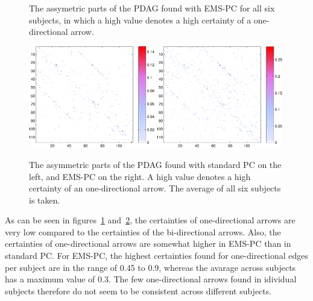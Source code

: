 \documentclass[a4paper, 10pt, english, onecolumn]{article}
\begin{document}
\begin{figure}[h!]
  \caption{The assymetric parts of the PDAG found with EMS-PC for all six subjects, in which a high value denotes a high certainty of a one-directional arrow.}
\label{fig:asym_subjects}
\end{figure}

\begin{figure}[h!]
  \centering
  \includegraphics[width=0.49\textwidth]{images/new/assym_avg_mod-crop}
  \includegraphics[width=0.49\textwidth]{images/new/assym_avg_expl-crop}
  \caption{The asymmetric parts of the PDAG found with standard PC on the left, and EMS-PC on the right. A high value denotes a high certainty of an one-directional arrow. The average of all six subjects is taken.}
  \label{fig:asym_avg}
\end{figure}

As can be seen in figures~\ref{fig:asym_subjects} and~\ref{fig:asym_avg}, the certainties of one-directional arrows are very low compared to the certainties of the bi-directional arrows. Also, the certainties of one-directional arrows are somewhat higher in EMS-PC than in standard PC.
For EMS-PC, the highest certainties found for one-directional edges per subject are in the range of 0.45 to 0.9, whereas the avarage across subjects has a maximum value of 0.3.
The few one-directional arrows found in idividual subjects therefore do not seem to be consistent across different subjects.
\end{document}
